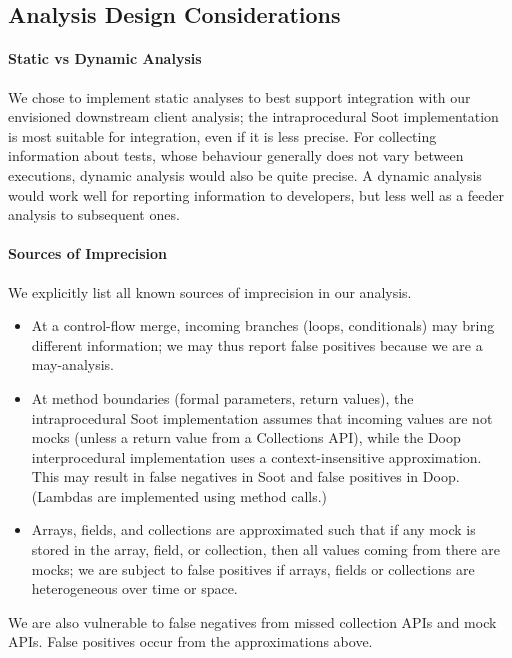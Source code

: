
\subsection{Analysis Design Considerations}
\paragraph{Static vs Dynamic Analysis}
We chose to implement static analyses to best support integration with our envisioned downstream client analysis; the intraprocedural Soot implementation is most suitable for integration, even if it is less precise. For collecting information about tests, whose behaviour generally does not vary between executions, dynamic analysis would also be quite precise. A dynamic analysis would work well for reporting information to developers, but less well as a feeder analysis to subsequent ones.

\paragraph{Sources of Imprecision}
We explicitly list all known sources of imprecision in our analysis.
\begin{itemize}[noitemsep]
\item At a control-flow merge,  incoming branches (loops, conditionals) may bring different information; we may thus report false positives because we are a may-analysis.
\item At method boundaries (formal parameters, return values), the intraprocedural Soot implementation assumes that incoming values are not mocks (unless a return value from a Collections API), while the Doop interprocedural implementation uses a context-insensitive approximation. This may result in false negatives in Soot and false positives in Doop. (Lambdas are implemented using method calls.)
\item Arrays, fields, and collections are approximated such that if any mock is stored in the array, field, or collection, then all values coming from there are mocks; we are subject to false positives if arrays, fields or collections are heterogeneous over time or space.
\end{itemize}
We are also vulnerable to false negatives from missed collection APIs and mock APIs. False positives occur from the approximations above.


